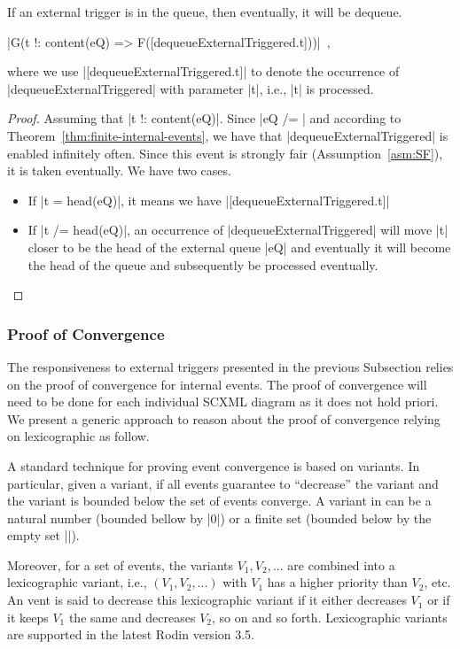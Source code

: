 \begin{theorem}
  \label{thm:resp-ext-trg}
  If an external trigger is in the queue, then eventually, it will be dequeue.
  \begin{center}
    |G(t !: content(eQ) => F([dequeueExternalTriggered.t]))|~,
  \end{center}
  where we use |[dequeueExternalTriggered.t]| to denote the occurrence of
  |dequeueExternalTriggered| with parameter |t|, i.e., |t| is processed.
\end{theorem}
\begin{proof}
  Assuming that |t !: content(eQ)|. Since |eQ /= {}| and according to
  Theorem~\ref{thm:finite-internal-events}, we have that
  |dequeueExternalTriggered| is enabled infinitely often.  Since this
  event is strongly fair (Assumption~\ref{asm:SF}), it is taken
  eventually. We have two cases.
  \begin{itemize}
  \item If |t = head(eQ)|, it means we have
    |[dequeueExternalTriggered.t]|
    
  \item If |t /= head(eQ)|, an occurrence of |dequeueExternalTriggered|
    will move |t| closer to be the head of the external queue |eQ| and
    eventually it will become the head of the queue and subsequently
    be processed eventually.
  \end{itemize}
\end{proof}

\subsubsection{Proof of Convergence}
\label{sec:proof-convergence}
The responsiveness to external triggers presented in the previous
Subsection relies on the proof of convergence for internal events. The
proof of convergence will need to be done for each individual SCXML
diagram as it does not hold priori.  We present a generic approach to
reason about the proof of convergence relying on lexicographic as
follow.

A standard technique for proving event convergence is based on
variants.  In particular, given a variant, if all events guarantee to
``decrease'' the variant and the variant is bounded below the set of
events converge.  A variant in \EventB can be a natural number
(bounded bellow by |0|) or a finite set (bounded below by the empty
set |{}|).

Moreover, for a set of events, the variants $V_1, V_2, ...$ are combined into a
lexicographic variant, i.e., $(V_1, V_2, ...)$ with $V_1$ has a higher
priority than $V_2$, etc. An vent is said to decrease this
lexicographic variant if it either decreases $V_1$ or if it keeps
$V_1$ the same and decreases $V_2$, so on and so forth.  Lexicographic
variants are supported in the latest Rodin version 3.5.

